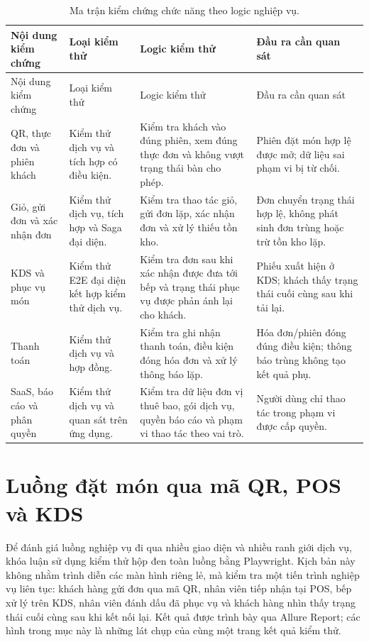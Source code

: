 {\scriptsize\sloppy
\setlength{\tabcolsep}{2pt}
\begin{longtable}{>{\raggedright\arraybackslash}p{}>{\raggedright\arraybackslash}p{}>{\raggedright\arraybackslash}p{}>{\raggedright\arraybackslash}p{}}
  \caption{Ma trận kiểm chứng chức năng theo logic nghiệp vụ.}
  \label{tab:chapter6-functional-validation}\\
  \toprule
  Nội dung kiểm chứng & Loại kiểm thử & Logic kiểm thử & Đầu ra cần quan sát \\
  \midrule
  \endfirsthead
  \toprule
  Nội dung kiểm chứng & Loại kiểm thử & Logic kiểm thử & Đầu ra cần quan sát \\
  \midrule
  \endhead
  \bottomrule
  \endfoot
  QR, thực đơn và phiên khách & Kiểm thử dịch vụ và tích hợp có điều kiện. & Kiểm tra khách vào đúng phiên, xem đúng thực đơn và không vượt trạng thái bàn cho phép. & Phiên đặt món hợp lệ được mở; dữ liệu sai phạm vi bị từ chối. \\
  Giỏ, gửi đơn và xác nhận đơn & Kiểm thử dịch vụ, tích hợp và Saga đại diện. & Kiểm tra thao tác giỏ, gửi đơn lặp, xác nhận đơn và xử lý thiếu tồn kho. & Đơn chuyển trạng thái hợp lệ, không phát sinh đơn trùng hoặc trừ tồn kho lặp. \\
  KDS và phục vụ món & Kiểm thử E2E đại diện kết hợp kiểm thử dịch vụ. & Kiểm tra đơn sau khi xác nhận được đưa tới bếp và trạng thái phục vụ được phản ánh lại cho khách. & Phiếu xuất hiện ở KDS; khách thấy trạng thái cuối cùng sau khi tải lại. \\
  Thanh toán & Kiểm thử dịch vụ và hợp đồng. & Kiểm tra ghi nhận thanh toán, điều kiện đóng hóa đơn và xử lý thông báo lặp. & Hóa đơn/phiên đóng đúng điều kiện; thông báo trùng không tạo kết quả phụ. \\
  SaaS, báo cáo và phân quyền & Kiểm thử dịch vụ và quan sát trên ứng dụng. & Kiểm tra dữ liệu đơn vị thuê bao, gói dịch vụ, quyền báo cáo và phạm vi thao tác theo vai trò. & Người dùng chỉ thao tác trong phạm vi được cấp quyền. \\
\end{longtable}
}

\section{Luồng đặt món qua mã QR, POS và KDS}

Để đánh giá luồng nghiệp vụ đi qua nhiều giao diện và nhiều ranh giới dịch vụ, khóa luận sử dụng kiểm thử hộp đen toàn luồng bằng Playwright. Kịch bản này không nhằm trình diễn các màn hình riêng lẻ, mà kiểm tra một tiến trình nghiệp vụ liên tục: khách hàng gửi đơn qua mã QR, nhân viên tiếp nhận tại POS, bếp xử lý trên KDS, nhân viên đánh dấu đã phục vụ và khách hàng nhìn thấy trạng thái cuối cùng sau khi kết nối lại. Kết quả được trình bày qua Allure Report; các hình trong mục này là những lát chụp của cùng một trang kết quả kiểm thử.

